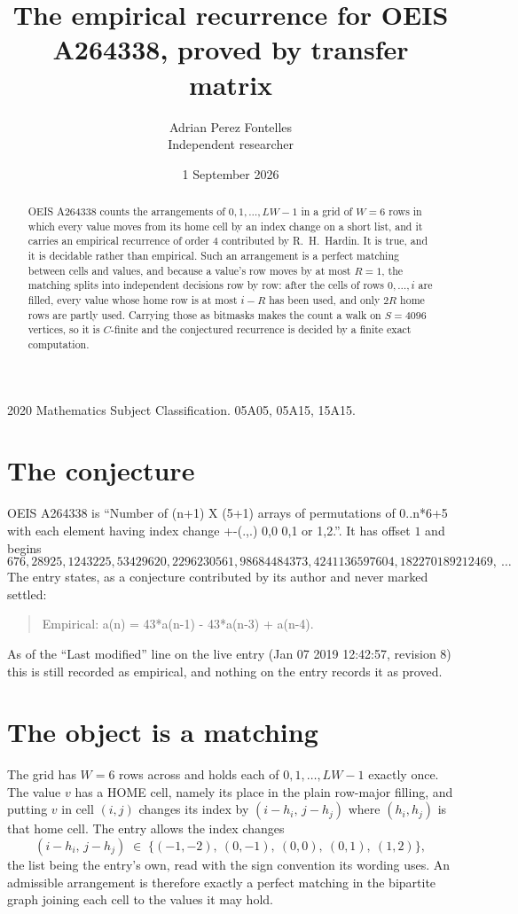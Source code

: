 \documentclass[11pt,a4paper]{article}
\title{The empirical recurrence for OEIS A264338, proved by transfer matrix}
\author{Adrian Perez Fontelles\\ \small Independent researcher}
\date{1 September 2026}
\theoremstyle{plain}
\theoremstyle{definition}
\begin{document}
\maketitle

\begin{abstract}
OEIS A264338 counts the arrangements of $0,1,\dots,LW-1$ in a grid of $W=6$ rows in which
every value moves from its home cell by an index change on a short list, and it carries an
empirical recurrence of order $4$ contributed by R.~H.~Hardin. It is true, and it is
decidable rather than empirical. Such an arrangement is a perfect matching between cells and
values, and because a value's row moves by at most $R=1$, the matching splits into
independent decisions row by row: after the cells of rows $0,\dots,i$ are filled,
every value whose home row is at most $i-R$ has been used, and only $2R$ home rows are
partly used. Carrying those as bitmasks makes the count a walk on $S=4096$ vertices, so it is
$C$-finite and the conjectured recurrence is decided by a finite exact computation.
\end{abstract}

\noindent\small 2020 Mathematics Subject Classification. 05A05, 05A15, 15A15.\normalsize

\section{The conjecture}

OEIS A264338 is ``Number of (n+1) X (5+1) arrays of permutations of 0..n*6+5 with each element having index change +-(.,.) 0,0 0,1 or 1,2.''. It has offset $1$ and begins
\[
676, 28925, 1243225, 53429620, 2296230561, 98684484373, 4241136597604, 182270189212469,\ \dots
\]
The entry states, as a conjecture contributed by its author and never marked settled:
\begin{quote}
Empirical: a(n) = 43*a(n-1) - 43*a(n-3) + a(n-4).
\end{quote}
As of the ``Last modified'' line on the live entry (Jan 07 2019 12:42:57, revision 8) this is still
recorded as empirical, and nothing on the entry records it as proved.

\section{The object is a matching}

The grid has $W=6$ rows across and holds each of $0,1,\dots,LW-1$ exactly once. The value
$v$ has a HOME cell, namely its place in the plain row-major filling, and putting $v$ in cell
$(i,j)$ changes its index by $(i-h_i,\,j-h_j)$ where $(h_i,h_j)$ is that home cell. The entry
allows the index changes
\[
(i-h_i,\,j-h_j)\;\in\;\{(-1,-2),\ (0,-1),\ (0,0),\ (0,1),\ (1,2)\},
\]
the list being the entry's own, read with the sign convention its wording uses. An admissible
arrangement is therefore exactly a perfect matching in the bipartite graph joining each cell to
the values it may hold.
\end{document}
